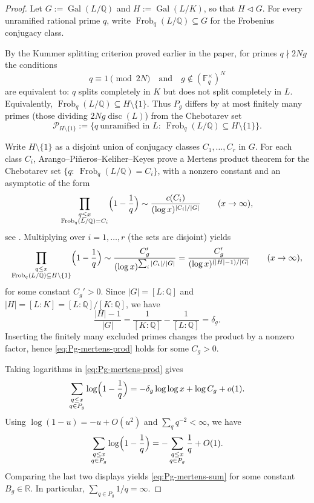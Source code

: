 \documentclass[11pt,letterpaper]{amsart}
\newcommand{\Q}{\mathbb{Q}}
\newcommand{\R}{\mathbb{R}}
\newcommand{\F}{\mathbb{F}}
\newcommand{\disc}{\operatorname{disc}}
\newcommand{\Gal}{\operatorname{Gal}}
\newcommand{\Frob}{\operatorname{Frob}}
\theoremstyle{plain}
\theoremstyle{definition}
\theoremstyle{remark}
\theoremstyle{plain}
\begin{document}
\begin{proof}
Let $G:=\Gal(L/\Q)$ and $H:=\Gal(L/K)$, so that $H\lhd G$. For every unramified rational prime $q$,
write $\Frob_q(L/\Q)\subseteq G$ for the Frobenius conjugacy class.

By the Kummer splitting criterion proved earlier in the paper, for primes $q\nmid 2Ng$ the conditions
\[
q\equiv 1\pmod{2N}
\quad\text{and}\quad
g\notin(\F_q^\times)^N
\]
are equivalent to: $q$ splits completely in $K$ but does not split completely in $L$.
Equivalently, $\Frob_q(L/\Q)\subseteq H\setminus\{1\}$.
Thus $P_g$ differs by at most finitely many primes (those dividing $2Ng\disc(L)$) from the Chebotarev set
\[
\mathcal{P}_{H\setminus\{1\}}:=\{q\ \text{unramified in }L:\ \Frob_q(L/\Q)\subseteq H\setminus\{1\}\}.
\]

Write $H\setminus\{1\}$ as a disjoint union of conjugacy classes $C_1,\dots,C_r$ in $G$.
For each class $C_i$, Arango--Pi\~neros--Keliher--Keyes prove a Mertens product theorem for the Chebotarev
set $\{q:\ \Frob_q(L/\Q)=C_i\}$, with a nonzero constant and an asymptotic of the form
\[
\prod_{\substack{q\le x\\ \Frob_q(L/\Q)=C_i}}\Bigl(1-\frac1q\Bigr)
\sim \frac{c(C_i)}{(\log x)^{|C_i|/|G|}}
\qquad (x\to\infty),
\]
see \cite[Theorem~A]{AKK22}.
Multiplying over $i=1,\dots,r$ (the sets are disjoint) yields
\[
\prod_{\substack{q\le x\\ \Frob_q(L/\Q)\subseteq H\setminus\{1\}}}\Bigl(1-\frac1q\Bigr)
\sim \frac{C_g'}{(\log x)^{\sum_i |C_i|/|G|}}
=\frac{C_g'}{(\log x)^{(|H|-1)/|G|}}
\qquad (x\to\infty),
\]
for some constant $C_g'>0$.
Since $|G|=[L:\Q]$ and $|H|=[L:K]=[L:\Q]/[K:\Q]$, we have
\[
\frac{|H|-1}{|G|}
=\frac1{[K:\Q]}-\frac1{[L:\Q]}
=\delta_g.
\]
Inserting the finitely many excluded primes changes the product by a nonzero factor, hence
\eqref{eq:Pg-mertens-prod} holds for some $C_g>0$.


Taking logarithms in \eqref{eq:Pg-mertens-prod} gives
\[
\sum_{\substack{q\le x\\ q\in P_g}}\log\Bigl(1-\frac1q\Bigr)
= -\delta_g\log\log x + \log C_g + o(1).
\]
Using $\log(1-u)=-u+O(u^2)$ and $\sum_q q^{-2}<\infty$, we have
\[
\sum_{\substack{q\le x\\ q\in P_g}}\log\Bigl(1-\frac1q\Bigr)
=
-\sum_{\substack{q\le x\\ q\in P_g}}\frac1q + O(1).
\]
Comparing the last two displays yields \eqref{eq:Pg-mertens-sum} for some constant $B_g\in\R$.
In particular, $\sum_{q\in P_g}1/q=\infty$.
\end{proof}
\end{document}
